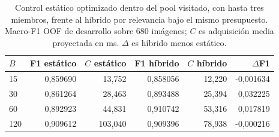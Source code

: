 \begin{table}[!htbp]
\centering\fontsize{8}{10}\selectfont
\caption{Control estático optimizado dentro del pool visitado, con hasta tres miembros, frente al híbrido por relevancia bajo el mismo presupuesto. Macro-F1 OOF de desarrollo sobre 680 imágenes; $C$ es adquisición media proyectada en ms. $\Delta$ es híbrido menos estático.}
\label{tab:estatico-presupuesto}
\begin{tabular}{@{}lrrrrr@{}}
\toprule
$B$ & F1 estático & $C$ estático & F1 híbrido & $C$ híbrido & $\Delta$F1\\
\midrule
15 & 0,859690 & 13,752 & 0,858056 & 12,220 & -0,001634\\
30 & 0,861264 & 28,463 & 0,893488 & 25,394 & 0,032225\\
60 & 0,892923 & 44,831 & 0,910742 & 53,316 & 0,017819\\
120 & 0,909612 & 103,040 & 0,909396 & 78,938 & -0,000216\\
\bottomrule
\end{tabular}
\end{table}

